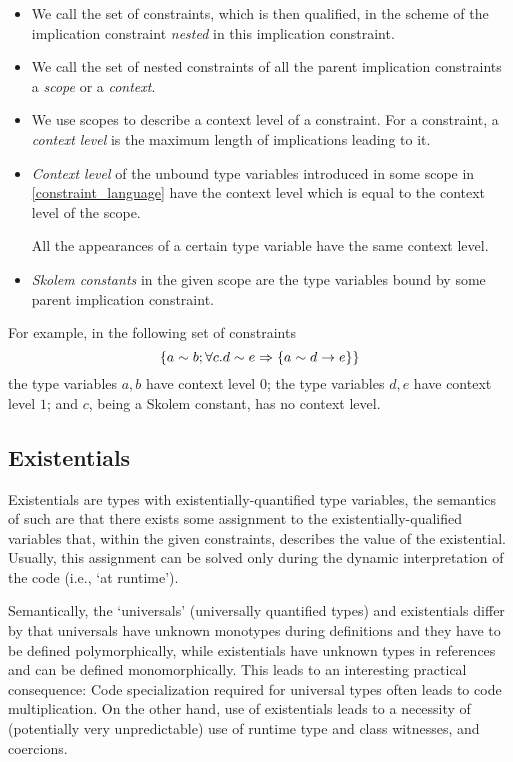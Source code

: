 \begin{defn}[Naming]
    \begin{itemize}
        \item We call the set of constraints, which is then qualified, in the scheme of the implication constraint \emph{nested} in this implication constraint.

        \item We call the set of nested constraints of all the parent implication constraints a \emph{scope} or a \emph{context}.

        \item We use scopes to describe a context level of a constraint. For a constraint, a \emph{context level} is the maximum length of implications leading to it.

        \item \emph{Context level} of the unbound type variables introduced in some scope in \cref{constraint_language} have the context level which is equal to the context level of the scope. \label{constness_level}

        All the appearances of a certain type variable have the same context level.

        \item \emph{Skolem constants} in the given scope are the type variables bound by some parent implication constraint.
    \end{itemize}
\end{defn}

For example, in the following set of constraints
\[ \left\{ a \sim b; \forall c. d \sim e \Rightarrow \left\{ a \sim d \to e \right\} \right\} \]
the type variables $a, b$ have context level $0$; the type variables $d, e$ have context level $1$; and $c$, being a Skolem constant, has no context level.

\subsection{Existentials}

\label{existentials}

Existentials are types with existentially-quantified type variables, the semantics of such are that there exists some assignment to the existentially-qualified variables that, within the given constraints, describes the value of the existential. Usually, this assignment can be solved only during the dynamic interpretation of the code (i.e., `at runtime').

Semantically, the `universals' (universally quantified types) and existentials differ by that universals have unknown monotypes during definitions and they have to be defined polymorphically, while existentials have unknown types in references and can be defined monomorphically. This leads to an interesting practical consequence: Code specialization required for universal types often leads to code multiplication. On the other hand, use of existentials leads to a necessity of (potentially very unpredictable) use of runtime type and class witnesses, and coercions.

